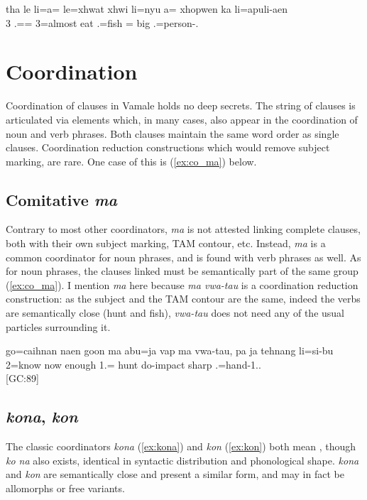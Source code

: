 \ea
\label{ex:tree2}
\gll tha le li=a= le=xhwat xhwi li=nyu a= xhopwen ka li=apuli-aen\\
   3 .== 3=almost eat .=fish = big  .=person-.\\
\glt {} 
\z

\section{Coordination}
Coordination of clauses in Vamale holds no deep secrets. The string of clauses is articulated via elements which, in many cases, also appear in the coordination of noun and verb phrases. Both clauses maintain the same word order as single clauses. Coordination reduction constructions which would remove subject marking, are rare. One case of this is (\ref{ex:co_ma}) below.

\subsection{Comitative \textit{ma}}
\label{ssec:coord_ma}
Contrary to most other coordinators, \textit{ma} is not attested linking complete clauses, both with their own subject marking, TAM contour, etc. Instead, \textit{ma} is a common coordinator for noun phrases, and is found with verb phrases as well. As for noun phrases, the clauses linked must be semantically part of the same group (\ref{ex:co_ma}). I mention \textit{ma} here because \textit{ma vwa-tau} is a coordination reduction construction: as the subject and the TAM contour are the same, indeed the verbs are semantically close (hunt and fish), \textit{vwa-tau}  does not need any of the usual particles surrounding it.

\ea \label{ex:co_ma}\gll go=caihnan naen goon ma abu=ja vap {ma} vwa-tau, pa ja tehnang li=si-bu\\
 2=know now enough  1.= hunt  do-impact   sharp .=hand-1..\\
\glt {} {[GC:89]}
\z

\subsection{\textit{kona}, \textit{kon} }
The classic coordinators \textit{kona} (\ref{ex:kona}) and \textit{kon} (\ref{ex:kon}) both mean , though \textit{ko na}  also exists, identical in syntactic distribution and phonological shape. \textit{kona} and \textit{kon} are semantically close and present a similar form, and may in fact be allomorphs or free variants. 


